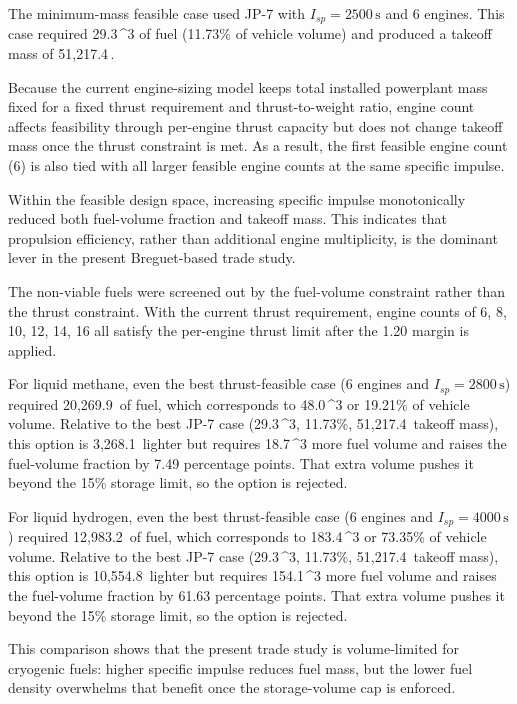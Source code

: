 The minimum-mass feasible case used JP-7 with $I_{sp}=2500\,\mathrm{s}$ and 6 engines. This case required 29.3\,^{3} of fuel (11.73\% of vehicle volume) and produced a takeoff mass of 51,217.4\,.

Because the current engine-sizing model keeps total installed powerplant mass fixed for a fixed thrust requirement and thrust-to-weight ratio, engine count affects feasibility through per-engine thrust capacity but does not change takeoff mass once the thrust constraint is met. As a result, the first feasible engine count (6) is also tied with all larger feasible engine counts at the same specific impulse.

Within the feasible design space, increasing specific impulse monotonically reduced both fuel-volume fraction and takeoff mass. This indicates that propulsion efficiency, rather than additional engine multiplicity, is the dominant lever in the present Breguet-based trade study.

The non-viable fuels were screened out by the fuel-volume constraint rather than the thrust constraint. With the current thrust requirement, engine counts of 6, 8, 10, 12, 14, 16 all satisfy the per-engine thrust limit after the 1.20 margin is applied.

For liquid methane, even the best thrust-feasible case (6 engines and $I_{sp}=2800\,\mathrm{s}$) required 20,269.9\, of fuel, which corresponds to 48.0\,^{3} or 19.21\% of vehicle volume. Relative to the best JP-7 case (29.3\,^{3}, 11.73\%, 51,217.4\, takeoff mass), this option is 3,268.1\, lighter but requires 18.7\,^{3} more fuel volume and raises the fuel-volume fraction by 7.49 percentage points. That extra volume pushes it beyond the 15\% storage limit, so the option is rejected.

For liquid hydrogen, even the best thrust-feasible case (6 engines and $I_{sp}=4000\,\mathrm{s}$) required 12,983.2\, of fuel, which corresponds to 183.4\,^{3} or 73.35\% of vehicle volume. Relative to the best JP-7 case (29.3\,^{3}, 11.73\%, 51,217.4\, takeoff mass), this option is 10,554.8\, lighter but requires 154.1\,^{3} more fuel volume and raises the fuel-volume fraction by 61.63 percentage points. That extra volume pushes it beyond the 15\% storage limit, so the option is rejected.

This comparison shows that the present trade study is volume-limited for cryogenic fuels: higher specific impulse reduces fuel mass, but the lower fuel density overwhelms that benefit once the storage-volume cap is enforced.
